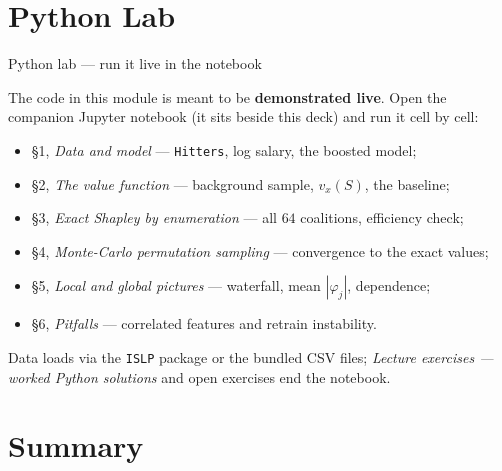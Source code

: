 \documentclass[aspectratio=169,11pt]{beamer}
\begin{document}
\section{Python Lab}

\begin{frame}{Python lab --- run it live in the notebook}
  \begin{labnote}
    The code in this module is meant to be \textbf{demonstrated live}. Open the
    companion Jupyter notebook (it sits beside this deck) and run it
    cell by cell:
    \begin{itemize}
      \item \S1, \emph{Data and model} --- \texttt{Hitters}, log salary, the boosted model;
      \item \S2, \emph{The value function} --- background sample, $v_x(S)$, the baseline;
      \item \S3, \emph{Exact Shapley by enumeration} --- all $64$ coalitions, efficiency check;
      \item \S4, \emph{Monte-Carlo permutation sampling} --- convergence to the exact values;
      \item \S5, \emph{Local and global pictures} --- waterfall, mean $|\varphi_j|$, dependence;
      \item \S6, \emph{Pitfalls} --- correlated features and retrain instability.
    \end{itemize}
    Data loads via the \texttt{ISLP} package or the bundled CSV files;
    \emph{Lecture exercises --- worked Python solutions} and open exercises end
    the notebook.
  \end{labnote}
\end{frame}

\section{Summary}
\end{document}
